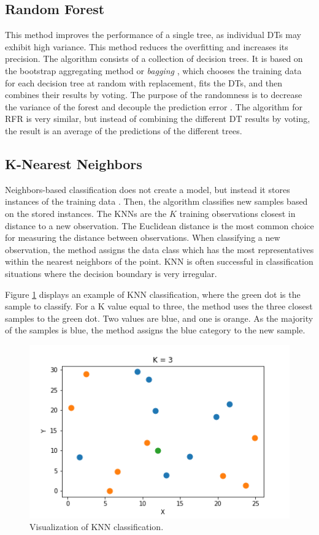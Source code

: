 \subsection{Random Forest}


This method improves the performance of a single tree, as individual DTs may exhibit high variance.
This method reduces the overfitting and increases its precision.
The algorithm consists of a collection of decision trees.
It is based on the bootstrap aggregating method or \textit{bagging} \cite{breiman_bagging_1996}, which chooses the training data for each decision tree at random with replacement, fits the \glspl*{DT}, and then combines their results by voting.
The purpose of the randomness is to decrease the variance of the forest and decouple the prediction error \cite{pedregosa_scikit-learn_2011}.
The algorithm for \gls*{RFR} is very similar, but instead of combining the different DT results by voting, the result is an average of the predictions of the different trees.


\subsection{K-Nearest Neighbors}


Neighbors-based classification does not create a model, but instead it stores instances of the training data \cite{pedregosa_scikit-learn_2011}.
Then, the algorithm classifies new samples based on the stored instances.
The KNNs are the $K$ training observations closest in distance to a new observation.
The Euclidean distance is the most common choice for measuring the distance between observations.
When classifying a new observation, the method assigns the data class which has the most representatives within the nearest neighbors of the point.
\gls*{KNN} is often successful in classification situations where the decision boundary is very irregular.

Figure \ref{fig:knn} displays an example of KNN classification, where the green dot is the sample to classify.
For a K value equal to three, the method uses the three closest samples to the green dot.
Two values are blue, and one is orange.
As the majority of the samples is blue, the method assigns the blue category to the new sample.

\begin{figure}[htbp!] %
  \centering
  \includegraphics[width=0.5\linewidth]{figures/knns}
  \caption{Visualization of KNN classification.}
  \label{fig:knn}
\end{figure}

